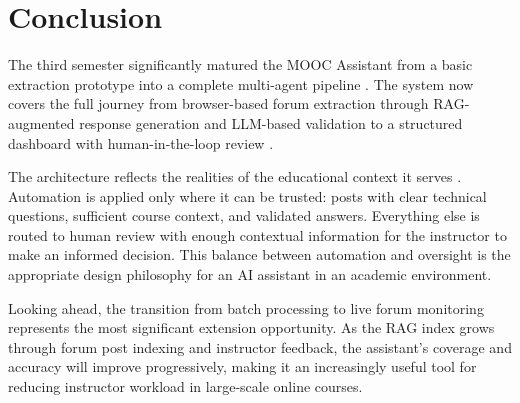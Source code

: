 \documentclass[12pt, a4paper]{article}
\begin{document}
\section{Conclusion}

The third semester significantly matured the MOOC Assistant from a basic extraction prototype into a complete multi-agent pipeline \cite{gaultier2024mcp}. The system now covers the full journey from browser-based forum extraction through RAG-augmented response generation \cite{lewis2020rag} and LLM-based validation to a structured dashboard with human-in-the-loop review \cite{gaultier2024mcp}.

The architecture reflects the realities of the educational context it serves \cite{kasneci2023chatgpt}. Automation is applied only where it can be trusted: posts with clear technical questions, sufficient course context, and validated answers. Everything else is routed to human review with enough contextual information for the instructor to make an informed decision. This balance between automation and oversight is the appropriate design philosophy for an AI assistant in an academic environment.

Looking ahead, the transition from batch processing to live forum monitoring represents the most significant extension opportunity. As the RAG index grows through forum post indexing and instructor feedback, the assistant's coverage and accuracy will improve progressively, making it an increasingly useful tool for reducing instructor workload in large-scale online courses.

\newpage
\end{document}
